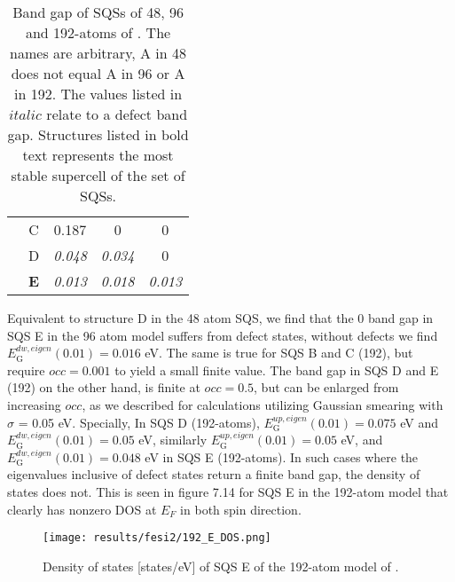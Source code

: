 \begin{table}[H]
\begin{tabular}{@{}ccccc@{}}
\multicolumn{1}{c|}{}                     & C          & 0.187                                                                         & 0                                                                              & 0                                                                               \\
\multicolumn{1}{c|}{}                     & D          & \textit{0.048}                                                                & \textit{0.034}                                                                         & 0                                                                              \\
\multicolumn{1}{c|}{}                     & \textbf{E} & \textit{0.013}                                                                & \textit{0.018}                                                                         & \textit{0.013}                                                                          \\ \bottomrule 
\end{tabular}
\caption{Band gap of SQSs of 48, 96 and 192-atoms of . The names are arbitrary, A in 48 does not equal A in 96 or A in 192. The values listed in $italic$ relate to a defect band gap. Structures listed in bold text represents the most stable supercell of the set of SQSs.}
\end{table}

Equivalent to structure D in the 48 atom SQS, we find that the 0 band gap in SQS E in the 96 atom model suffers from defect states, without defects we find $E_\text{G} ^{dw, eigen}(0.01) = 0.016$ eV. The same is true for SQS B and C (192), but require $occ = 0.001$ to yield a small finite value. The band gap in SQS D and E (192) on the other hand, is finite at $occ = 0.5$, but can be enlarged from increasing $occ$, as we described for calculations utilizing Gaussian smearing with $\sigma$ = 0.05 eV. Specially, In SQS D (192-atoms), $E_\text{G} ^{up, eigen}(0.01) = 0.075$ eV and $E_\text{G} ^{dw, eigen}(0.01) = 0.05$ eV, similarly $E_\text{G} ^{up, eigen}(0.01) = 0.05$ eV, and $E_\text{G} ^{dw, eigen}(0.01) = 0.048$ eV in SQS E (192-atoms). In such cases where the eigenvalues inclusive of defect states return a finite band gap, the density of states does not. This is seen in figure 7.14 for SQS E in the 192-atom model that clearly has nonzero DOS at $E_F$ in both spin direction. 

\begin{figure}[H]
\centering
\texttt{[image: results/fesi2/192\_E\_DOS.png]}
\caption{Density of states [states/eV] of SQS E of the 192-atom model of .}
\end{figure}    
 

